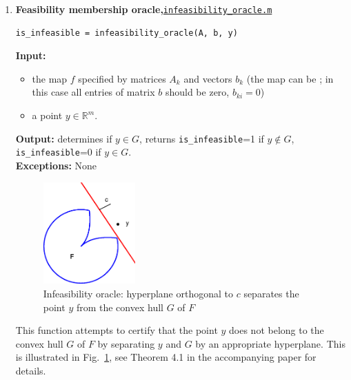 \documentclass[a4paper]{article}
\theoremstyle{definition}
\begin{document}
\begin{enumerate}
\item {\bf Feasibility membership oracle,\hskip 6pt}\underline{\tt  infeasibility\_oracle.m}
\begin{verbatim}
is_infeasible = infeasibility_oracle(A, b, y)
\end{verbatim}
{\bf Input:}
\begin{itemize}
\item the map $f$ specified by matrices $A_k$ and vectors $b_k$ (the map can be ; in this case all entries of matrix  $b$ should be zero, $b_{ki}=0$)
\item a point $y\in\mathbb{R}^m$.
\end{itemize}
{\bf Output:} determines if $y\in G$, returns {\tt is\_infeasible}=1 if $y\notin G$, {\tt is\_infeasible}=0 if $y\in G$.\\
{\bf Exceptions:} None

\begin{figure}[H]
	\centering\includegraphics[width=100pt]{fig/infeasibility_oracle}\captionsetup{width=.8\linewidth}
	\caption{Infeasibility oracle: hyperplane orthogonal to $c$ separates the point $y$ from the convex hull $G$ of $F$}
\label{fig:one}
\end{figure}

This function attempts to certify that the point $y$ does not belong to the convex hull $G$ of $F$ by separating $y$ and $G$ by an appropriate hyperplane.
This is illustrated in Fig.~\ref{fig:one}, see Theorem 4.1 in the accompanying paper for details.


\end{enumerate}
\end{document}
